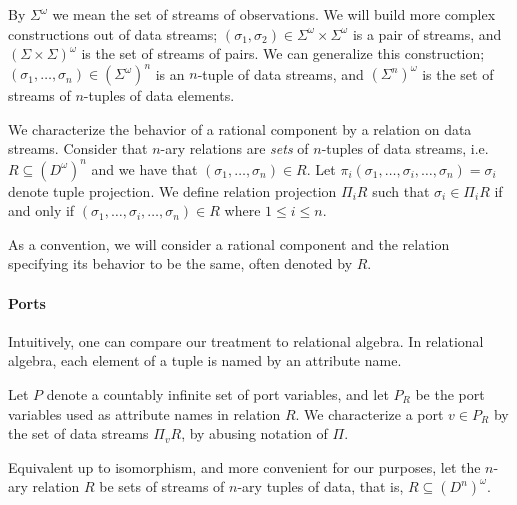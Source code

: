 \medskip

By $\Sigma^{\omega}$ we mean the set of streams of observations.
We will build more complex constructions out of data streams;
$(\sigma_1,\sigma_2)\in \Sigma^\omega\times \Sigma^\omega$ is a pair of streams,
and $(\Sigma\times \Sigma)^\omega$ is the set of streams of pairs.
We can generalize this construction;
$(\sigma_1,\ldots,\sigma_n)\in(\Sigma^\omega)^n$ is an $n$-tuple of data streams,
and $(\Sigma^n)^\omega$ is the set of streams of $n$-tuples of data elements.

We characterize the behavior of a rational component by a relation on data streams.
Consider that $n$-ary relations are \emph{sets} of $n$-tuples of data streams,
i.e. $R\subseteq (D^\omega)^n$ and we have that $(\sigma_{1},\ldots,\sigma_{n})\in R$.
Let $\pi_i(\sigma_{1},\ldots,\sigma_{i},\ldots,\sigma_{n})=\sigma_{i}$ denote tuple projection.
We define relation projection $\Pi_i R$ such that $\sigma_i\in\Pi_i R$ if and only if $(\sigma_{1},\ldots,\sigma_i,\ldots,\sigma_{n})\in R$ where $1\leq i\leq n$.

As a convention, we will consider a rational component and the relation specifying its behavior
to be the same, often denoted by $R$.

\paragraph{Ports}
Intuitively, one can compare our treatment to relational algebra.
In relational algebra, each element of a tuple is named by an attribute name.

Let $P$ denote a countably infinite set of port variables, and let $P_R$ be the port variables
used as attribute names in relation $R$. We characterize a port $v\in P_R$ by the set of data streams $\Pi_v R$, by abusing notation of $\Pi$.

Equivalent up to isomorphism, and more convenient for our purposes,
let the $n$-ary relation $R$ be sets of streams of $n$-ary tuples of data,
that is, $R\subseteq (D^n)^\omega$.

